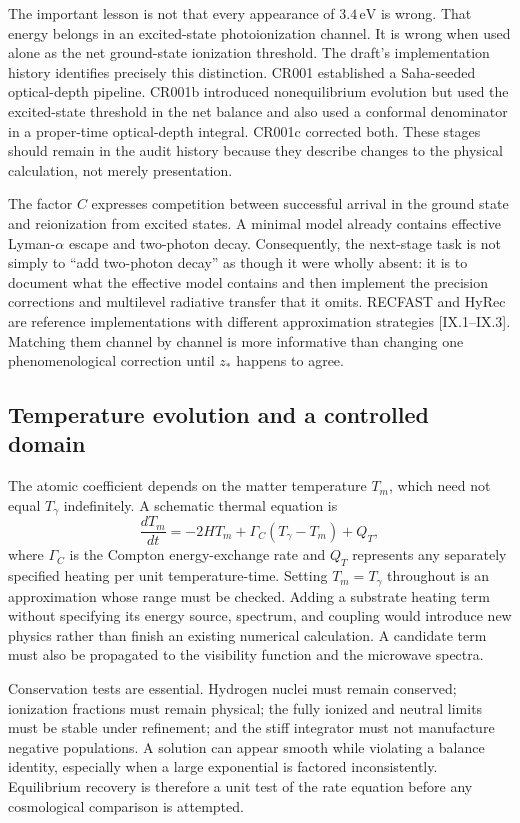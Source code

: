 The important lesson is not that every appearance of $3.4\,\mathrm{eV}$ is wrong. That energy belongs in an excited-state photoionization channel. It is wrong when used alone as the net ground-state ionization threshold. The draft's implementation history identifies precisely this distinction. CR001 established a Saha-seeded optical-depth pipeline. CR001b introduced nonequilibrium evolution but used the excited-state threshold in the net balance and also used a conformal denominator in a proper-time optical-depth integral. CR001c corrected both. These stages should remain in the audit history because they describe changes to the physical calculation, not merely presentation.

The factor $C$ expresses competition between successful arrival in the ground state and reionization from excited states. A minimal model already contains effective Lyman-$\alpha$ escape and two-photon decay. Consequently, the next-stage task is not simply to ``add two-photon decay'' as though it were wholly absent: it is to document what the effective model contains and then implement the precision corrections and multilevel radiative transfer that it omits. RECFAST and HyRec are reference implementations with different approximation strategies [IX.1--IX.3]. Matching them channel by channel is more informative than changing one phenomenological correction until $z_*$ happens to agree.

\subsection{Temperature evolution and a controlled domain}

The atomic coefficient depends on the matter temperature $T_m$, which need not equal $T_\gamma$ indefinitely. A schematic thermal equation is
\begin{equation}
 \frac{dT_m}{dt}=-2HT_m+\Gamma_C(T_\gamma-T_m)+Q_T,
 \label{c9:mattertemperature}
\end{equation}
where $\Gamma_C$ is the Compton energy-exchange rate and $Q_T$ represents any separately specified heating per unit temperature-time. Setting $T_m=T_\gamma$ throughout is an approximation whose range must be checked. Adding a substrate heating term without specifying its energy source, spectrum, and coupling would introduce new physics rather than finish an existing numerical calculation. A candidate term must also be propagated to the visibility function and the microwave spectra.

Conservation tests are essential. Hydrogen nuclei must remain conserved; ionization fractions must remain physical; the fully ionized and neutral limits must be stable under refinement; and the stiff integrator must not manufacture negative populations. A solution can appear smooth while violating a balance identity, especially when a large exponential is factored inconsistently. Equilibrium recovery is therefore a unit test of the rate equation before any cosmological comparison is attempted.

